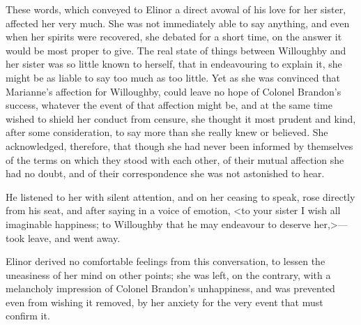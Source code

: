 These words, which conveyed to Elinor a direct avowal of his love for her sister, affected her very much. She was not immediately able to say anything, and even when her spirits were recovered, she debated for a short time, on the answer it would be most proper to give. The real state of things between Willoughby and her sister was so little known to herself, that in endeavouring to explain it, she might be as liable to say too much as too little. Yet as she was convinced that Marianne's affection for Willoughby, could leave no hope of Colonel Brandon's success, whatever the event of that affection might be, and at the same time wished to shield her conduct from censure, she thought it most prudent and kind, after some consideration, to say more than she really knew or believed. She acknowledged, therefore, that though she had never been informed by themselves of the terms on which they stood with each other, of their mutual affection she had no doubt, and of their correspondence she was not astonished to hear.

He listened to her with silent attention, and on her ceasing to speak, rose directly from his seat, and after saying in a voice of emotion, <to your sister I wish all imaginable happiness; to Willoughby that he may endeavour to deserve her,>—took leave, and went away.

Elinor derived no comfortable feelings from this conversation, to lessen the uneasiness of her mind on other points; she was left, on the contrary, with a melancholy impression of Colonel Brandon's unhappiness, and was prevented even from wishing it removed, by her anxiety for the very event that must confirm it.
